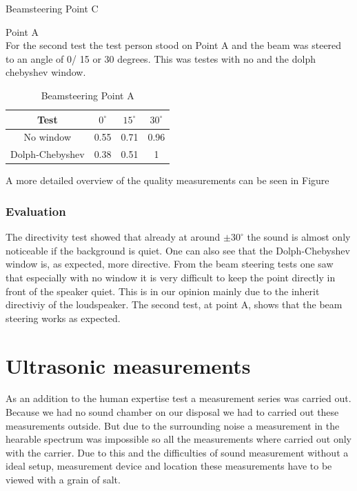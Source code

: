 \begin{enumerate}
\begin{center}
\begin{table}[h!]
    \caption{Beamsteering Point C}
    \label{6.1.3_tab:music_audio_volume_steering_c}
    \end{table}   
    \end{center}
     \subitem Point A\\
    For the second test the test person stood on Point A and the beam was steered to an angle of 0/ 15 or 30 degrees. This was testes with no and the dolph chebyshev window.
    \begin{center}
     \begin{table}[h!]
    \centering
    \begin{tabular}{ |c|c|c|c|}
      \hline 
      Test & $0^\circ$ & $15^\circ$ & $30^\circ$ \\ 
      \hline
     No window & 0.55 & 0.71 & 0.96 \\
     \hline
     Dolph-Chebyshev & 0.38 & 0.51 & 1 \\
     \hline
    \end{tabular}
    \caption{Beamsteering Point A}
    \label{6.1.3_tab:music_audio_volume_steering_A}
    \end{table}   
    \end{center}
\end{enumerate}
A more detailed overview of the quality measurements can be seen in Figure 
\subsubsection{Evaluation}
The directivity test showed that already at around $\pm 30^\circ$ the sound is almost only noticeable if the background is quiet. One can also see that the Dolph-Chebyshev window is, as expected, more directive. From the beam steering tests one saw that especially with no window it is very difficult to keep the point directly in front of the speaker quiet. This is in our opinion mainly due to the inherit directiviy of the loudspeaker. The second test, at point A, shows that the beam steering works as expected.   
\section{Ultrasonic measurements}
As an addition to the human expertise test a measurement series was carried out. Because we had no sound chamber on our disposal we had to carried out these measurements outside. But due to the surrounding noise a measurement in the hearable spectrum was impossible so all the measurements where carried out only with the carrier. Due to this and the difficulties of sound measurement without a ideal setup, measurement device and location these measurements have to be viewed with a grain of salt.
